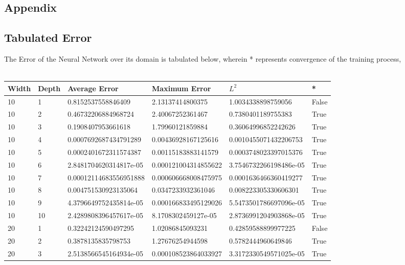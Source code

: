\documentclass[a4paper, 12pt]{report}
\def\tabsize{4.4cm}
\def\stabsize{0.97cm}
\def\mtabsize{0.73cm}
\begin{document}
\begin{center}
\section{Appendix}

\subsection{Tabulated Error}
The Error of the Neural Network over its domain is tabulated below, wherein * represents convergence of the training process,
\\~\\\begin{longtable}{|m{\stabsize}|m{\stabsize}|m{\tabsize}|m{\tabsize}|m{\tabsize}|m{\mtabsize}|}
\hline
Width & Depth & Average Error & Maximum Error & $L^2$ & * \\ \hline
10 & 1 & 0.8152537558846409 & 2.13137414800375 & 1.0034338898759056 & False \\ \hline  
10 & 2 & 0.46732206884968724 & 2.40067252361467 & 0.7380401189755383 & True \\ \hline  
10 & 3 & 0.1908407953661618 & 1.79960121859884 & 0.36064996852242626 & True \\ \hline  
10 & 4 & 0.0007692687434791289 & 0.00436928167125616 & 0.0010455071432206753 & True \\ \hline  
10 & 5 & 0.0002401672311574387 & 0.00115183883141579 & 0.0003748023397015376 & True \\ \hline  
10 & 6 & 2.8481704620314817e-05 & 0.000121004314855622 & 3.7546732266198486e-05 & True \\ \hline  
10 & 7 & 0.00012114683556951888 & 0.000606668008475975 & 0.0001636466360419277 & True \\ \hline  
10 & 8 & 0.004751530923135064 & 0.0347233932361046 & 0.008223305330606301 & True \\ \hline  
10 & 9 & 4.3796649752435814e-05 & 0.000166833495129026 & 5.5473501786697096e-05 & True \\ \hline  
10 & 10 & 2.4289808396457617e-05 & 8.1708302459127e-05 & 2.8736991204903868e-05 & True \\ \hline  
20 & 1 & 0.32242124590497295 & 1.02086845093231 & 0.42859588899977225 & False \\ \hline  
20 & 2 & 0.3878135835798753 & 1.27676254944598 & 0.5782444960649846 & True \\ \hline  
20 & 3 & 2.5138566545164934e-05 & 0.000108523864033927 & 3.3172330549571025e-05 & True \\ \hline  

\end{longtable}
\end{center}
\end{document}
